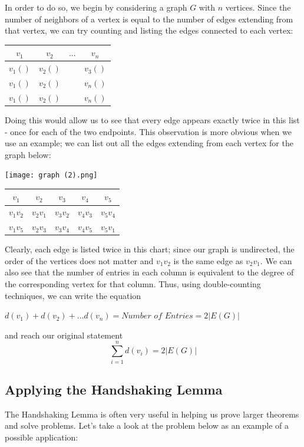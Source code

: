 \documentclass{article}
\begin{document}
\begin{multicols}{2}
In order to do so, we begin by considering a graph $G$ with $n$ vertices. Since the number of neighbors of a vertex is equal to the number of edges extending from that vertex, we can try counting and listing the edges connected to each vertex: 

\begin{center}
    \begin{tabular}{|c|c|c|c|}
\hline
$v_1$ & $v_2$ & $...$ & $v_n$ \\
\hline
$v_1()$ & $v_2()$ &  & $v_3()$ \\
$v_1()$ & $v_2()$ &   & $v_n()$ \\
$v_1()$ & $v_2()$ &  & $v_n()$ \\
\hline
\end{tabular}
\end{center}

Doing this would allow us to see that every edge appears exactly twice in this list - once for each of the two endpoints. This observation is more obvious when we use an example; we can list out all the edges extending from each vertex for the graph below:

\begin{center}
    \texttt{[image: graph (2).png]}
    \begin{tabular}{|c|c|c|c|c|}
\hline
$v_1$ & $v_2$ & $v_3$ & $v_4$ & $v_5$ \\
\hline
$v_1v_2$ & $v_2v_1$ & $v_3v_2$ & $v_4v_3$ & $v_5v_4$ \\
$v_1v_5$ & $v_2v_3$ & $v_3v_4$  & $v_4v_5$ &$v_5v_1$\\
\hline
\end{tabular}
\end{center}

Clearly, each edge is listed twice in this chart; since our graph is undirected, the order of the vertices does not matter and $v_1v_2$ is the same edge as $v_2v_1$. We can also see that the number of entries in each column is equivalent to the degree of the corresponding vertex for that column. Thus, using double-counting techniques, we can write the equation

\begin{center}
   $d(v_1)+d(v_2)+ ...  d(v_n) = \textit{Number of Entries} = 2|E(G)|$ 
\end{center}

and reach our original statement 
\begin{equation*}
\sum^{n}_{i=1} d(v_i) = 2|E(G)|
\end{equation*}
\subsection*{Applying the Handshaking Lemma}
The Handshaking Lemma is often very useful in helping us prove larger theorems and solve problems. Let's take a look at the problem below as an example of a possible application:


\end{multicols}
\end{document}
